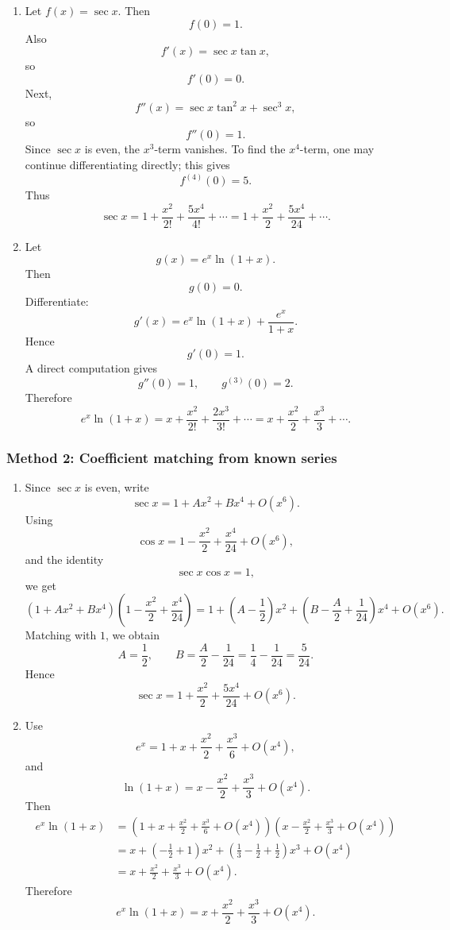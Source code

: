 \documentclass[12pt]{article}
\begin{document}
\begin{enumerate}[label=(\alph*)]

\item
Let \(f(x)=\sec x\). Then
\[
f(0)=1.
\]
Also
\[
f'(x)=\sec x\tan x,
\]
so
\[
f'(0)=0.
\]
Next,
\[
f''(x)=\sec x\tan^2x+\sec^3x,
\]
so
\[
f''(0)=1.
\]
Since \(\sec x\) is even, the \(x^3\)-term vanishes. To find the \(x^4\)-term, one may continue differentiating directly; this gives
\[
f^{(4)}(0)=5.
\]
Thus
\[
\boxed{
\sec x=1+\frac{x^2}{2!}+\frac{5x^4}{4!}+\cdots
=
1+\frac{x^2}{2}+\frac{5x^4}{24}+\cdots.
}
\]



\newpage
\item
Let
\[
g(x)=e^x\ln(1+x).
\]
Then
\[
g(0)=0.
\]
Differentiate:
\[
g'(x)=e^x\ln(1+x)+\frac{e^x}{1+x}.
\]
Hence
\[
g'(0)=1.
\]
A direct computation gives
\[
g''(0)=1,\qquad g^{(3)}(0)=2.
\]
Therefore
\[
\boxed{
e^x\ln(1+x)
=
x+\frac{x^2}{2!}+\frac{2x^3}{3!}+\cdots
=
x+\frac{x^2}{2}+\frac{x^3}{3}+\cdots.
}
\]

\end{enumerate}

\newpage
\subsubsection{Method 2: Coefficient matching from known series}

\begin{enumerate}[label=(\alph*)]

\item
Since \(\sec x\) is even, write
\[
\sec x=1+Ax^2+Bx^4+O(x^6).
\]
Using
\[
\cos x=1-\frac{x^2}{2}+\frac{x^4}{24}+O(x^6),
\]
and the identity
\[
\sec x\cos x=1,
\]
we get
\[
(1+Ax^2+Bx^4)
\left(1-\frac{x^2}{2}+\frac{x^4}{24}\right)
=
1+\left(A-\frac12\right)x^2
+
\left(B-\frac{A}{2}+\frac{1}{24}\right)x^4
+O(x^6).
\]
Matching with \(1\), we obtain
\[
A=\frac12,
\qquad
B=\frac{A}{2}-\frac{1}{24}
=
\frac14-\frac{1}{24}
=
\frac{5}{24}.
\]
Hence
\[
\boxed{
\sec x=1+\frac{x^2}{2}+\frac{5x^4}{24}+O(x^6).
}
\]

\item
Use
\[
e^x=1+x+\frac{x^2}{2}+\frac{x^3}{6}+O(x^4),
\]
and
\[
\ln(1+x)=x-\frac{x^2}{2}+\frac{x^3}{3}+O(x^4).
\]
Then
\begin{align*}
e^x\ln(1+x)
&=
\left(1+x+\frac{x^2}{2}+\frac{x^3}{6}+O(x^4)\right)
\left(x-\frac{x^2}{2}+\frac{x^3}{3}+O(x^4)\right)\\
&=
x+\left(-\frac12+1\right)x^2
+
\left(\frac13-\frac12+\frac12\right)x^3
+O(x^4)\\
&=
x+\frac{x^2}{2}+\frac{x^3}{3}+O(x^4).
\end{align*}
Therefore
\[
\boxed{
e^x\ln(1+x)=x+\frac{x^2}{2}+\frac{x^3}{3}+O(x^4).
}
\]

\end{enumerate}
\end{document}
